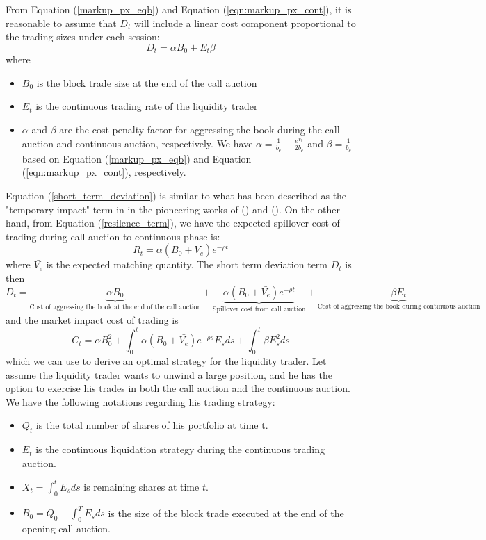 \documentclass{article}
\begin{document}
From Equation (\ref{markup_px_eqb}) and Equation (\ref{eqn:markup_px_cont}), it is reasonable to assume that $D_t$ will include a linear cost component proportional to the trading sizes under each session:
\begin{equation}\label{short_term_deviation}
  D_t = \alpha B_0 + E_t \beta
\end{equation}
where
\begin{itemize}
  \item $B_0$ is the block trade size at the end of the call auction
  \item $E_t$ is the continuous trading rate of the liquidity trader
  \item $\alpha$ and $\beta$ are the cost penalty factor for aggressing the book during the call auction and continuous auction, respectively. We have $\alpha=\frac{1}{b_e}-\frac{e^{V_0}}{2 b_e}$ and $\beta=\frac{1}{b_c}$ based on Equation (\ref{markup_px_eqb}) and Equation (\ref{eqn:markup_px_cont}), respectively.
\end{itemize}
Equation (\ref{short_term_deviation}) is similar to what has been described as the "temporary impact" term in in the pioneering works of (\cite{BertimasLo1999}) and (\cite{AlmgrenChriss2000}). On the other hand, from Equation (\ref{resilence_term}), we have the expected spillover cost of trading during call auction to continuous phase is:
\[
  R_t = \alpha (B_0 + \bar{V_e}) e^{-\rho t}
\]
where $\bar{V_e}$ is the expected matching quantity. The short term deviation term $D_t$ is then
\[
  D_t = \underbrace{\alpha B_0 }_\text{Cost of aggressing the book at the end of the call auction} +
  \underbrace{\alpha (B_0 + \bar{V_e}) e^{-\rho t}}_\text{Spillover cost from call auction} +  \underbrace{\beta E_t}_\text{Cost of aggressing the book during continuous auction}
\]
and the market impact cost of trading is
\begin{equation}\label{cost_equation_all}
  C_t = \alpha B_0^2 + \int_0^t \alpha (B_0 + \bar{V_e}) e^{-\rho s} E_s ds + \int_0^t \beta E_s^2 ds
\end{equation}
which we can use to derive an optimal strategy for the liquidity trader. Let assume the liquidity trader wants to unwind a large position, and he has the option to exercise his trades in both the call auction and the continuous auction. We have the following notations regarding his trading strategy:

\begin{itemize}
  \item $Q_t$ is the total number of shares of his portfolio at time t.
  \item $E_t$ is the continuous liquidation strategy during the continuous trading auction.
  \item $X_t=\int_0^t E_s ds$ is remaining shares at time $t$.
  \item $B_0=Q_0 - \int_0^T E_s ds$ is the size of the block trade executed at the end of the opening call auction.
\end{itemize}
\end{document}
